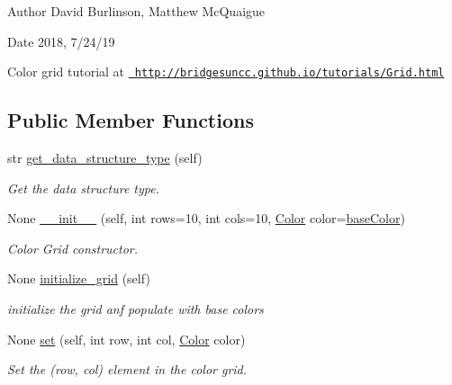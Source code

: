\begin{DoxyAuthor}{Author}
David Burlinson, Matthew Mc\+Quaigue
\end{DoxyAuthor}
\begin{DoxyDate}{Date}
2018, 7/24/19
\end{DoxyDate}
Color grid tutorial at \href{http://bridgesuncc.github.io/tutorials/Grid.html}{\texttt{ http\+://bridgesuncc.\+github.\+io/tutorials/\+Grid.\+html}} \subsection*{Public Member Functions}
\begin{DoxyCompactItemize}
\item 
str \mbox{\hyperlink{classbridges_1_1color__grid_1_1_color_grid_a5340b1aed60318e37cab93eed6093070}{get\+\_\+data\+\_\+structure\+\_\+type}} (self)
\begin{DoxyCompactList}\small\item\em Get the data structure type. \end{DoxyCompactList}\item 
None \mbox{\hyperlink{classbridges_1_1color__grid_1_1_color_grid_a0dfc6a57286fca719146b68595cbff51}{\+\_\+\+\_\+init\+\_\+\+\_\+}} (self, int rows=10, int cols=10, \mbox{\hyperlink{classbridges_1_1color_1_1_color}{Color}} color=\mbox{\hyperlink{classbridges_1_1color__grid_1_1_color_grid_ad2db62703be80114e46b490ff02f8bd9}{base\+Color}})
\begin{DoxyCompactList}\small\item\em Color Grid constructor. \end{DoxyCompactList}\item 
None \mbox{\hyperlink{classbridges_1_1color__grid_1_1_color_grid_a7b21de607d59433f390ad4026aa9c3cf}{initialize\+\_\+grid}} (self)
\begin{DoxyCompactList}\small\item\em initialize the grid anf populate with base colors \end{DoxyCompactList}\item 
None \mbox{\hyperlink{classbridges_1_1color__grid_1_1_color_grid_a6160377225834aa80a5454fe5186da1e}{set}} (self, int row, int col, \mbox{\hyperlink{classbridges_1_1color_1_1_color}{Color}} color)
\begin{DoxyCompactList}\small\item\em Set the (row, col) element in the color grid. \end{DoxyCompactList}\item 

\end{DoxyCompactItemize}

